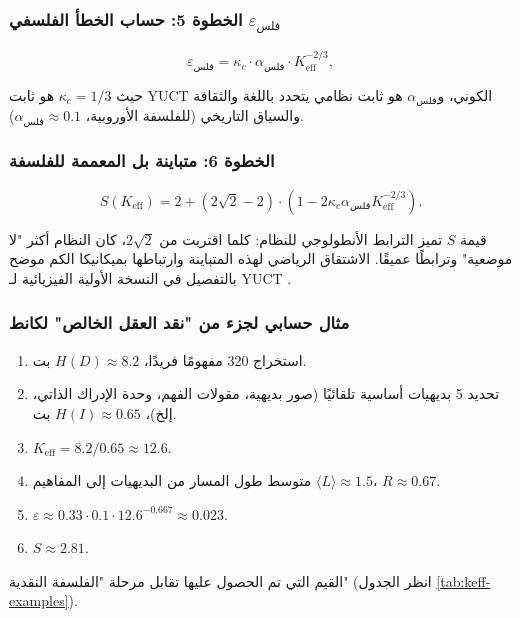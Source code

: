 \documentclass[11pt,a4paper]{article}
\newcommand{\kappac}{\kappa_c}
\newcommand{\eps}{\varepsilon}
\begin{document}
	\subsubsection{الخطوة 5: حساب الخطأ الفلسفي \(\eps_{\text{فلس}}\)}
	
	\[
	\eps_{\text{فلس}} = \kappac \cdot \alpha_{\text{فلس}} \cdot K_{\mathrm{eff}}^{-2/3},
	\]
	
	حيث \(\kappac = 1/3\) هو ثابت YUCT الكوني، و\(\alpha_{\text{فلس}}\) هو ثابت نظامي يتحدد باللغة والثقافة والسياق التاريخي (للفلسفة الأوروبية، \(\alpha_{\text{فلس}} \approx 0.1\)).
	
	\subsubsection{الخطوة 6: متباينة بل المعممة للفلسفة}
	
	\[
	S(K_{\mathrm{eff}}) = 2 + (2\sqrt{2} - 2) \cdot \left(1 - 2\kappac \alpha_{\text{فلس}} K_{\mathrm{eff}}^{-2/3}\right).
	\]
	
	قيمة \(S\) تميز الترابط الأنطولوجي للنظام: كلما اقتربت من \(2\sqrt{2}\)، كان النظام أكثر "لا موضعية" وترابطًا عميقًا. الاشتقاق الرياضي لهذه المتباينة وارتباطها بميكانيكا الكم موضح بالتفصيل في النسخة الأولية الفيزيائية لـ YUCT \cite{Yakushev2026b}.
	
	\subsubsection{مثال حسابي لجزء من "نقد العقل الخالص" لكانط}
	
	\begin{enumerate}
		\item استخراج 320 مفهومًا فريدًا، \(H(D) \approx 8.2\) بت.
		\item تحديد 5 بديهيات أساسية تلقائيًا (صور بديهية، مقولات الفهم، وحدة الإدراك الذاتي، إلخ)، \(H(I) \approx 0.65\) بت.
		\item \(K_{\mathrm{eff}} = 8.2 / 0.65 \approx 12.6\).
		\item متوسط طول المسار من البديهيات إلى المفاهيم \(\langle L \rangle \approx 1.5\)، \(R \approx 0.67\).
		\item \(\eps \approx 0.33 \cdot 0.1 \cdot 12.6^{-0.667} \approx 0.023\).
		\item \(S \approx 2.81\).
	\end{enumerate}
	
	القيم التي تم الحصول عليها تقابل مرحلة "الفلسفة النقدية" (انظر الجدول \ref{tab:keff-examples}).
	
	
\end{document}
